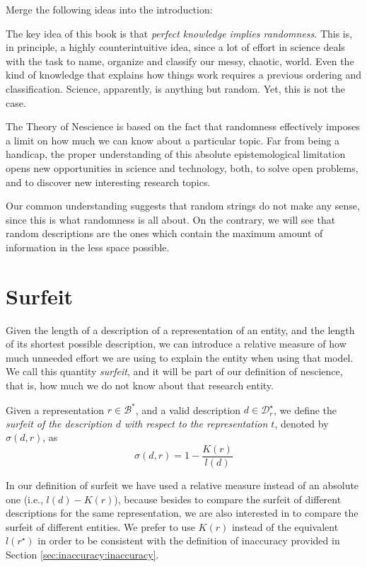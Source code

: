 {\color{red}

Merge the following ideas into the introduction:

The key idea of this book is that \emph{perfect knowledge implies randomness}. This is, in principle, a highly counterintuitive idea, since a lot of effort in science deals with the task to name, organize and classify our messy, chaotic, world. Even the kind of knowledge that explains how things work requires a previous ordering and classification. Science, apparently, is anything but random. Yet, this is not the case.

The Theory of Nescience is based on the fact that randomness effectively imposes a limit on how much we can know about a particular topic. Far from being a handicap, the proper understanding of this absolute epistemological limitation opens new opportunities in science and technology, both, to solve open problems, and to discover new interesting research topics.

Our common understanding suggests that random strings do not make any sense, since this is what randomness is all about. On the contrary, we will see that random descriptions are the ones which contain the maximum amount of information in the less space possible.
}

%
%

\section{Surfeit}
\label{sec:Definition_redundancy}

Given the length of a description of a representation of an entity, and the length of its shortest possible description, we can introduce a relative measure of how much unneeded effort we are using to explain the entity when using that model. We call this quantity \emph{surfeit}, and it will be part of our definition of nescience, that is, how much we do not know about that research entity.

\begin{definition}[Surfeit]
Given a representation $r \in \mathcal{B}^\ast$, and a valid description $d \in \mathcal{D}^\star_r$, we define the \emph{surfeit of the description $d$ with respect to the representation $t$}, denoted by $\sigma(d, r)$, as
\[
\sigma (d, r) = 1 - \frac{K(r)}{l(d)}
\]
\end{definition}

In our definition of surfeit we have used a relative measure instead of an absolute one (i.e., $l(d) - K(r)$), because besides to compare the surfeit of different descriptions for the same representation, we are also interested in to compare the surfeit of different entities. We prefer to use $K(r)$ instead of the equivalent $l \left( r^\star \right)$ in order to be consistent with the definition of inaccuracy provided in Section \ref{sec:inaccuracy:inaccuracy}.

